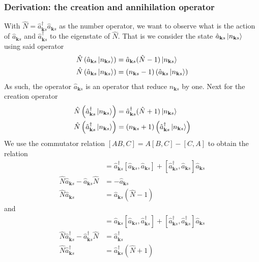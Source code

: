 \documentclass[../../../main.tex]{subfiles}
\begin{document}
\subsubsection{Derivation: the creation and annihilation operator}
With $\hat{N}= \hat{a}^\dagger_{\mathbf{k }s}  \hat{a}_{\mathbf{k }s} $ as the number operator, we want to observe what is the action of $\hat{a}_{\mathbf{k }s} $ and $\hat{a}^\dagger_{\mathbf{k }s} $ to the eigenstate of $\hat{N}$.
That is we consider the state $\hat{a}_{\mathbf{k }s}  \ket{n_{\mathbf{k }s}}$ using said operator
\begin{align*}
  \hat{N} \left( \hat{a}_{\mathbf{k }s} \ket{n_{\mathbf{k }s}} \right) & =  \hat{a}_{\mathbf{k }s} (\hat{N }-1  ) \ket{n_{\mathbf{k }s}}                        \\
  \hat{N} \left( \hat{a}_{\mathbf{k }s} \ket{n_{\mathbf{k }s}} \right) & =  (n_{\mathbf{k }s}-1  ) \left( \hat{a}_{\mathbf{k }s} \ket{n_{\mathbf{k }s}} \right)
\end{align*}
As such, the operator $\hat{a}_{\mathbf{k }s}  $ is an operator that reduce $n_{\mathbf{k }s}$ by one.
Next for the creation operator
\begin{align*}
  \hat{N} \left( \hat{a}^\dagger_{\mathbf{k }s} \ket{n_{\mathbf{k }s}} \right) & =  \hat{a}^\dagger_{\mathbf{k }s} (\hat{N }+1  ) \ket{n_{\mathbf{k }s}}                        \\
  \hat{N} \left( \hat{a}^\dagger_{\mathbf{k }s} \ket{n_{\mathbf{k }s}} \right) & =  (n_{\mathbf{k }s}+1) \left( \hat{a}^\dagger_{\mathbf{k }s} \ket{n_{\mathbf{k }s}} \right)
\end{align*}
We use the commutator relation $[AB,C]=A[B,C]-[C,A]$ to obtain the relation
\begin{align*}
  [N,\hat{a}_{\mathbf{k }s} ]                                    & = \hat{a}^\dagger_{\mathbf{k }s} [\hat{a}_{\mathbf{k }s} ,\hat{a}_{\mathbf{k }s} ]+[\hat{a}^\dagger_{\mathbf{k }s} ,\hat{a}_{\mathbf{k }s} ]\hat{a}_{\mathbf{k }s} \\
  \hat{N }\hat{a}_{\mathbf{k }s} -\hat{a}_{\mathbf{k }s} \hat{N} & = - \hat{a}_{\mathbf{k }s}                                                                                                                                           \\
  \hat{N }\hat{a}_{\mathbf{k }s}                                 & =  \hat{a}_{\mathbf{k }s} (\hat{N }-1)
\end{align*}
and
\begin{align*}
  [N,\hat{a}_{\mathbf{k }s}^\dagger ] & = \hat{a}_{\mathbf{k }s} [\hat{a}_{\mathbf{k }s} ,\hat{a}_{\mathbf{k }s}^\dagger ]+[\hat{a}^\dagger_{\mathbf{k }s} ,\hat{a}_{\mathbf{k }s}^\dagger ]\hat{a}_{\mathbf{k }s} \\
  \hat{N }\hat{a}_{\mathbf{k }s}^\dagger -\hat{a}_{\mathbf{k }s}^\dagger \hat{N} & = \hat{a}^\dagger_{\mathbf{k }s}                                                                                            \\
  \hat{N }\hat{a}_{\mathbf{k }s}^\dagger & =  \hat{a}_{\mathbf{k }s}^\dagger (\hat{N }+1)
\end{align*}
\end{document}
